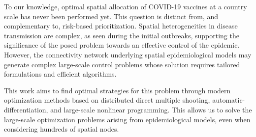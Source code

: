 To our knowledge, optimal spatial allocation of COVID-19 vaccines at a country scale has never been performed yet. This question is distinct from, and complementary to, risk-based prioritization. Spatial heterogeneities in disease transmission are complex, as seen during the initial outbreaks\cite{Gatto:SpreadDynamicsCOVID19:2020,Bertuzzo:GeographyCOVID19Spread:2020,Li:SubstantialUndocumentedInfection:2020}, supporting the significance of the posed problem towards an effective control of the epidemic. However, the connectivity network underlying spatial epidemiological models may generate complex large-scale control problems whose solution requires tailored formulations and efficient algorithms.  

This work aims to find optimal strategies for this problem through modern optimization methods based on distributed direct multiple shooting, automatic-differentiation, and large-scale nonlinear programming\cite{Bock:MultipleShootingAlgorithm:1984,Savorgnan:MultipleShootingDistributed:2011,Andersson:CasADiSoftwareFramework:2018,Wachter:ImplementationInteriorpointFilter:2006}. This allows us to solve the large-scale optimization problems arising from epidemiological models, even when considering hundreds of spatial nodes. 


